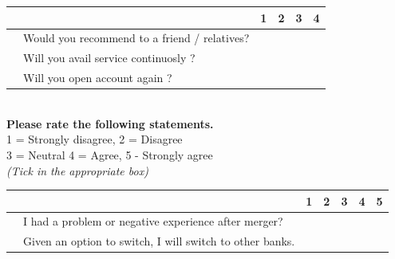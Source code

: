 \documentclass[a4paper, 12pt]{extarticle}
\newcounter{magicrownumbers}
\newcommand\rownumber{\stepcounter{magicrownumbers}\arabic{magicrownumbers}}
\newcommand\tab[1][1cm]{\hspace*{#1}}
\begin{document}
{\begin{minipage}{\textwidth}
\begin{tabularx}{\linewidth}{|l|l|X|X|X|X|}
\hline \multicolumn{2}{|c|}{} & 1 & 2 & 3 & 4\\
\hline \rownumber & Would you recommend to a friend / relatives? & \tab & \tab & \tab & \tab \\
\hline \rownumber & Will you avail service continuosly ?& \tab & \tab & \tab & \tab \\
\hline \rownumber & Will you open account again ? & \tab & \tab & \tab & \tab \\
\hline
\end{tabularx}

\end{minipage}
\tab \\
\textbf{Please rate the following statements.}\\
1 = Strongly disagree, 2 = Disagree \\
3 = Neutral
4 = Agree, 5 - Strongly agree\\
\emph {(Tick in the appropriate box)}\\
\begin{minipage}{\textwidth}

\begin{tabularx}{\linewidth}{|l|l|X|X|X|X|X|}
\hline \multicolumn{2}{|c|}{} & 1 & 2 & 3 & 4 & 5\\
\hline \rownumber & I had a problem or negative experience after merger? & \tab & \tab & \tab & \tab & \tab \\
\hline \rownumber & Given an option to switch, I will switch to other banks. & \tab & \tab & \tab & \tab & \tab \\
\hline
\end{tabularx}

\end{minipage}

\newpage
}
\end{document}
